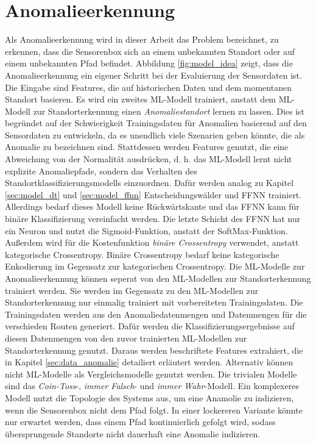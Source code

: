 \section{Anomalieerkennung}
Als Anomalieerkennung wird in dieser Arbeit das Problem bezeichnet, zu erkennen, dass die Sensorenbox sich an einem
unbekannten Standort oder auf einem unbekannten Pfad befindet.
Abbildung \ref{fig:model_idea} zeigt, dass die Anomalieerkennung ein eigener Schritt bei der Evaluierung der Sensordaten ist.
Die Eingabe sind Features, die auf historischen Daten und dem momentanen Standort basieren.
\newline
\newline
Es wird ein zweites ML-Modell trainiert, anstatt dem ML-Modell zur Standorterkennung einen \textit{Anomaliestandort} lernen zu lassen.
Dies ist begründet auf der Schwierigkeit Trainingsdaten für Anomalien basierend auf den Sensordaten zu entwickeln,
da es unendlich viele Szenarien geben könnte, die als Anomalie zu bezeichnen sind.
Stattdessen werden Features genutzt, die eine Abweichung von der Normalität ausdrücken,
d. h. das ML-Modell lernt nicht explizite Anomaliepfade, sondern das Verhalten des Standortklassifizierungsmodells einzuordnen.
\newline
\newline
Dafür werden analog zu Kapitel \ref{sec:model_dt} und \ref{sec:model_ffnn} Entscheidungswälder und FFNN trainiert.
Allerdings bedarf dieses Modell keine Rückwärtskante und das FFNN kann für binäre Klassifizierung vereinfacht werden.
Die letzte Schicht des FFNN hat nur ein Neuron und nutzt die Sigmoid-Funktion, anstatt der SoftMax-Funktion.
Außerdem wird für die Kostenfunktion \textit{binäre Crossentropy} verwendet, anstatt kategorische Crossentropy.
Binäre Crossentropy bedarf keine kategorische Enkodierung im Gegensatz zur kategorischen Crossentropy.
\newline
\newline
Die ML-Modelle zur Anomalieerkennung können seperat von den ML-Modellen zur Standorterkennung trainiert werden.
Sie werden im Gegensatz zu den ML-Modellen zur Standorterkennung nur einmalig trainiert mit vorbereiteten Trainingsdaten.
Die Trainingsdaten werden aus den Anomaliedatenmengen und Datenmengen für die verschieden Routen generiert.
Dafür werden die Klassifizierungsergebnisse auf diesen Datenmengen von den zuvor trainierten ML-Modellen zur Standorterkennung genutzt.
Daraus werden beschriftete Features extrahiert, die in Kapitel \ref{sec:data_anomalie} detailiert erläutert werden.
\newline
\newline
Alternativ können nicht ML-Modelle als Vergleichsmodelle genutzt werden.
Die trivialen Modelle sind das \textit{Coin-Toss}-, \textit{immer Falsch}- und \textit{immer Wahr}-Modell.
Ein komplexeres Modell nutzt die Topologie des Systems aus, um eine Anamolie zu indizieren, wenn die Sensorenbox nicht dem Pfad folgt.
In einer lockereren Variante könnte nur erwartet werden, dass einem Pfad kontinuierlich gefolgt wird,
sodass übersprungende Standorte nicht dauerhaft eine Anomalie indizieren.